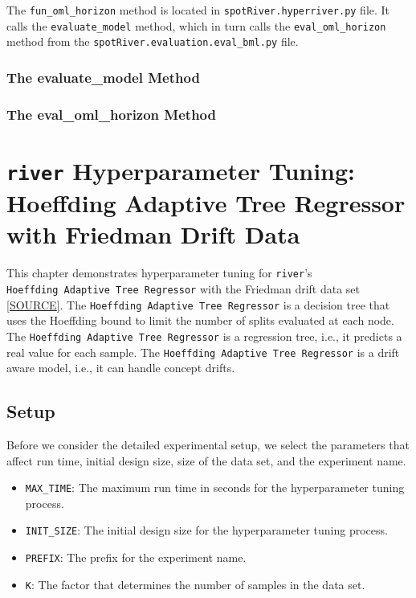 \documentclass[
  letterpaper,
  DIV=11,
  numbers=noendperiod]{scrreprt}
\providecommand{\tightlist}{%
  \setlength{\itemsep}{0pt}\setlength{\parskip}{0pt}}\usepackage{longtable,booktabs,array}
\begin{document}
The \texttt{fun\_oml\_horizon} method is located in
\texttt{spotRiver.hyperriver.py} file. It calls the
\texttt{evaluate\_model} method, which in turn calls the
\texttt{eval\_oml\_horizon} method from the
\texttt{spotRiver.evaluation.eval\_bml.py} file.

\subsection{The evaluate\_model Method}\label{the-evaluate_model-method}

\subsection{The eval\_oml\_horizon
Method}\label{the-eval_oml_horizon-method}

\chapter{\texorpdfstring{\texttt{river} Hyperparameter Tuning: Hoeffding
Adaptive Tree Regressor with Friedman Drift
Data}{river Hyperparameter Tuning: Hoeffding Adaptive Tree Regressor with Friedman Drift Data}}\label{sec-river-hpt}

This chapter demonstrates hyperparameter tuning for \texttt{river}'s
\texttt{Hoeffding\ Adaptive\ Tree\ Regressor} with the Friedman drift
data set
\href{https://riverml.xyz/0.18.0/api/datasets/synth/FriedmanDrift/}{{[}SOURCE{]}}.
The \texttt{Hoeffding\ Adaptive\ Tree\ Regressor} is a decision tree
that uses the Hoeffding bound to limit the number of splits evaluated at
each node. The \texttt{Hoeffding\ Adaptive\ Tree\ Regressor} is a
regression tree, i.e., it predicts a real value for each sample. The
\texttt{Hoeffding\ Adaptive\ Tree\ Regressor} is a drift aware model,
i.e., it can handle concept drifts.

\section{Setup}\label{sec-setup-13}

Before we consider the detailed experimental setup, we select the
parameters that affect run time, initial design size, size of the data
set, and the experiment name.

\begin{itemize}
\tightlist
\item
  \texttt{MAX\_TIME}: The maximum run time in seconds for the
  hyperparameter tuning process.
\item
  \texttt{INIT\_SIZE}: The initial design size for the hyperparameter
  tuning process.
\item
  \texttt{PREFIX}: The prefix for the experiment name.
\item
  \texttt{K}: The factor that determines the number of samples in the
  data set.
\end{itemize}
\end{document}
